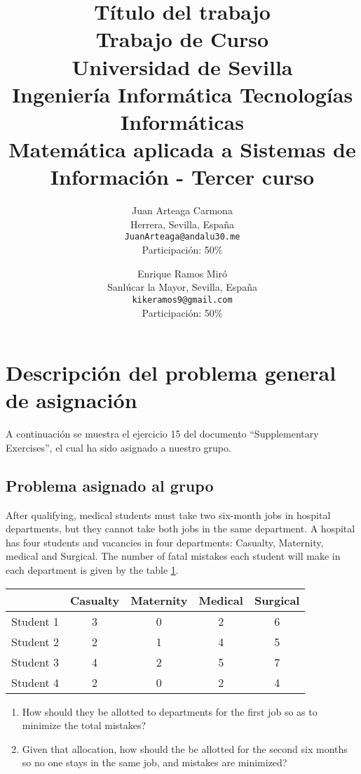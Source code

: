 \documentclass[11pt]{article}
\title{
        \textbf{Título del trabajo}\\
        \medskip
        \large{Trabajo de Curso}\\
        \bigskip
        Universidad de Sevilla\\ Ingeniería Informática Tecnologías Informáticas\\
        Matemática aplicada a Sistemas de Información - Tercer curso}
\author{
Juan Arteaga Carmona\\
Herrera, Sevilla, España \\
\texttt{JuanArteaga@andalu30.me}\\
Participación: 50\%
\and
Enrique Ramos Miró\\
Sanlúcar la Mayor, Sevilla, España \\
\texttt{kikeramos9@gmail.com}\\
Participación: 50\%
}
\begin{document}
\maketitle
\newpage

\tableofcontents
\listoftables
\listoffigures
\newpage

\section{Descripción del problema general de asignación}
A continuación se muestra el ejercicio 15 del documento ``Supplementary Exercises'', el cual ha sido asignado a nuestro grupo.

\subsection{Problema asignado al grupo}\label{sec:probasig}
After qualifying, medical students must take two six-month jobs in hospital departments, but they cannot take both jobs in the same department. A hospital has four students and vacancies in four departments: Casualty, Maternity, medical and Surgical. The number of fatal mistakes each student will make in each department is given by the table \ref{tab:tablaProblema}.

\begin{table}[h!]
\centering
\begin{tabular}{@{}lcccc@{}}
\toprule
 & \multicolumn{1}{l}{Casualty} & \multicolumn{1}{l}{Maternity} & \multicolumn{1}{l}{Medical} & \multicolumn{1}{l}{Surgical} \\ \midrule
Student 1 & 3 & 0 & 2 & 6 \\
Student 2 & 2 & 1 & 4 & 5 \\
Student 3 & 4 & 2 & 5 & 7 \\
Student 4 & 2 & 0 & 2 & 4 \\ \bottomrule
\end{tabular}
\label{tab:tablaProblema}
\end{table}

\begin{enumerate}
    \item How should they be allotted to departments for the first job so as to minimize the total mistakes?
    \item Given that allocation, how should the be allotted for the second six months so no one stays in the same job, and mistakes are minimized?
\end{enumerate}
\end{document}
